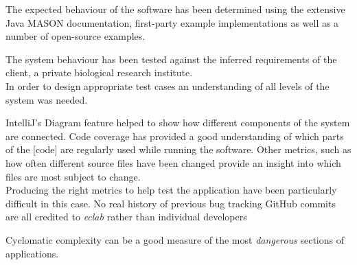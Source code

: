 \documentclass[11pt]{article}
\begin{document}
The expected behaviour of the software has been determined using the extensive Java MASON documentation\cite{mason_doc}, first-party example implementations as well as a number of open-source examples\cite{ppsim}.

The system behaviour has been tested against the inferred requirements of the client, a private biological research institute.
\\

In order to design appropriate test cases an understanding of all levels of the system was needed.

IntelliJ's Diagram feature helped to show how different components of the system are connected.
Code coverage has provided a good understanding of which parts of the [code] are regularly used while running the software.
Other metrics, such as how often different source files have been changed provide an insight into which files are most subject to change.
\\

Producing the right metrics to help test the application have been particularly difficult in this case.
No real history of previous bug tracking
GitHub commits are all credited to \textit{eclab} rather than individual developers

Cyclomatic complexity can be a good measure of the most \textit{dangerous} sections of applications.
\end{document}
